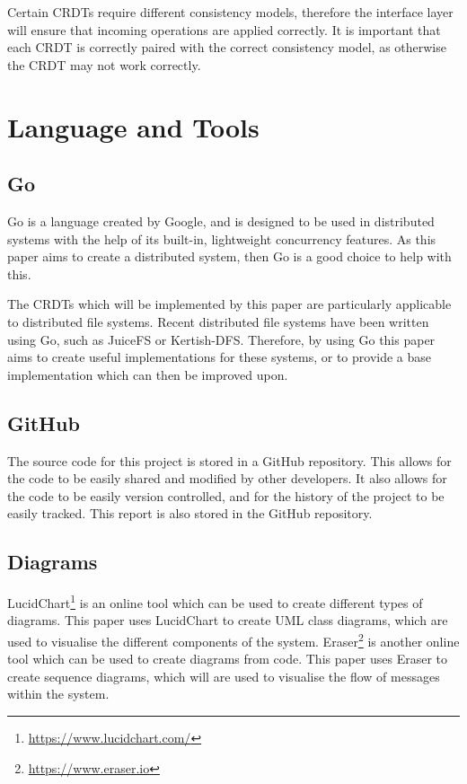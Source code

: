 \documentclass[12pt]{report}
\begin{document}
Certain CRDTs require different consistency models, therefore the interface layer will ensure that incoming operations are applied correctly. It is important that each CRDT is correctly paired with the correct consistency model, as otherwise the CRDT may not work correctly. \par

\section{Language and Tools}
\subsection{Go}
Go is a language created by Google, and is designed to be used in distributed systems with the help of its built-in, lightweight concurrency features. As this paper aims to create a distributed system, then Go is a good choice to help with this. \par

The CRDTs which will be implemented by this paper are particularly applicable to distributed file systems. Recent distributed file systems have been written using Go, such as JuiceFS or Kertish-DFS. Therefore, by using Go this paper aims to create useful implementations for these systems, or to provide a base implementation which can then be improved upon. \par


\subsection{GitHub}
The source code for this project is stored in a GitHub repository. This allows for the code to be easily shared and modified by other developers. It also allows for the code to be easily version controlled, and for the history of the project to be easily tracked. This report is also stored in the GitHub repository. \par

\subsection{Diagrams}
LucidChart\footnote{\url{https://www.lucidchart.com/}} is an online tool which can be used to create different types of diagrams. This paper uses LucidChart to create UML class diagrams, which are used to visualise the different components of the system. Eraser\footnote{\url{https://www.eraser.io}} is another online tool which can be used to create diagrams from code. This paper uses Eraser to create sequence diagrams, which will are used to visualise the flow of messages within the system. \par
\end{document}
